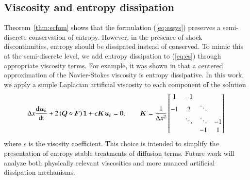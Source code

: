 \documentclass[preprint,10pt]{elsarticle}
\theoremstyle{definition}
\theoremstyle{lemma}
\theoremstyle{theorem}
\theoremstyle{assumption}
\newcommand{\td}[2]{\frac{{\rm d}#1}{{\rm d}{\rm #2}}}
\newcommand{\LRp}[1]{\left( #1 \right)}
\begin{document}
\subsection{Viscosity and entropy dissipation} 
\label{sec:entropydissipation}
Theorem~\ref{thm:ecfom} shows that the formulation (\ref{eq:essys}) preserves a semi-discrete conservation of entropy.  However, in the presence of shock discontinuities, entropy should be dissipated instead of conserved.  To mimic this at the semi-discrete level, we add entropy dissipation to (\ref{eq:es}) through appropriate viscosity terms.  For example, it was shown in \cite{tadmor2006entropy} that a centered approximation of the Navier-Stokes viscosity is entropy dissipative.  In this work, we apply a simple Laplacian artificial viscosity to each component of the solution \cite{upperman2019entropy}
\begin{equation}
\Delta x \td{\bm{u}_h}{t} + 2\LRp{{\bm{Q}}\circ \bm{F}}\bm{1} + \epsilon \bm{K}\bm{u}_h= 0, \qquad \bm{K} = \frac{1}{\Delta x^2} \begin{bmatrix}
1 & -1 & & \\
-1 & 2 & \ddots &\\
 & \ddots & \ddots & -1\\
 &  & -1& 1\\
\end{bmatrix}
\label{eq:esvisc}
\end{equation}
where $\epsilon$ is the visosity coefficient.  This choice is intended to simplify the presentation of entropy stable treatments of diffusion terms.  Future work will analyze both physically relevant viscosities and more nuanced artificial dissipation mechanisms.  
\end{document}
